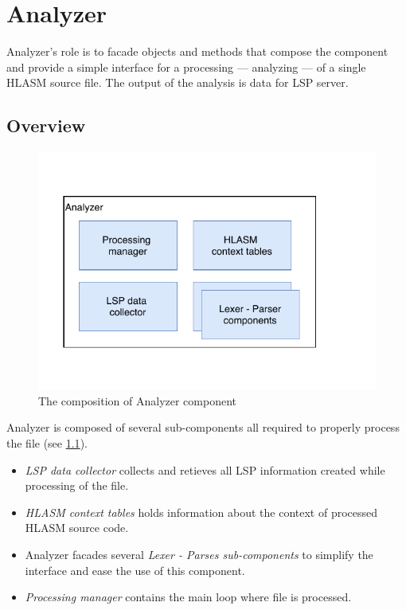 \chapter {Analyzer}

Analyzer's role is to facade objects and methods that compose the component and provide a simple interface for a processing --- analyzing --- of a single HLASM source file. The output of the analysis is data for LSP server.

\section{Overview}

\begin{figure}
	\centering
	\includegraphics[width=\textwidth / 2]{img/analyzer_arch}
	\caption{The composition of Analyzer component}
	\label{fig06:analyzer}
\end{figure}

Analyzer is composed of several sub-components all required to properly process the file (see \cref{fig06:analyzer}). 
\begin{itemize}
	\item \emph{LSP data collector} collects and retieves all LSP information created while processing of the file.
	\item \emph{HLASM context tables} holds information about the context of processed HLASM source code.
	\item Analyzer facades several \emph{Lexer - Parses sub-components} to simplify the interface and ease the use of this component.
	\item \emph{Processing manager} contains the main loop where file is processed.
\end{itemize}

